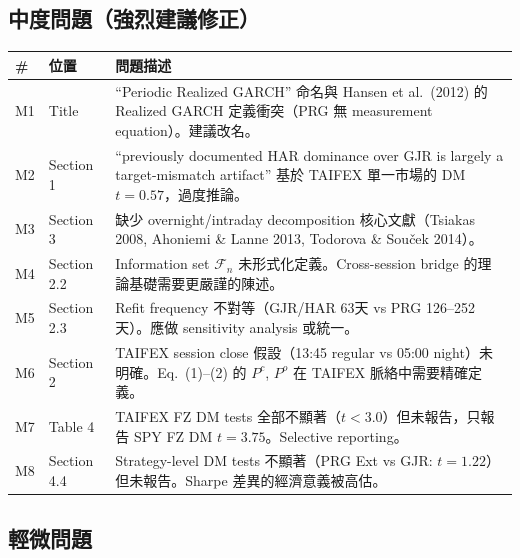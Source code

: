 \documentclass[12pt,a4paper]{article}
\begin{document}
\subsection*{中度問題（強烈建議修正）}

\begin{longtable}{p{0.5cm}p{2cm}p{11cm}}
\toprule
\# & 位置 & 問題描述 \\
\midrule
\endhead
M1 & Title & ``Periodic Realized GARCH'' 命名與 Hansen et al.\ (2012) 的 Realized GARCH 定義衝突（PRG 無 measurement equation）。建議改名。 \\
M2 & Section 1 & ``previously documented HAR dominance over GJR is largely a target-mismatch artifact'' 基於 TAIFEX 單一市場的 DM $t=0.57$，過度推論。 \\
M3 & Section 3 & 缺少 overnight/intraday decomposition 核心文獻（Tsiakas 2008, Ahoniemi \& Lanne 2013, Todorova \& Souček 2014）。 \\
M4 & Section 2.2 & Information set $\mathcal{F}_n$ 未形式化定義。Cross-session bridge 的理論基礎需要更嚴謹的陳述。 \\
M5 & Section 2.3 & Refit frequency 不對等（GJR/HAR 63天 vs PRG 126--252天）。應做 sensitivity analysis 或統一。 \\
M6 & Section 2 & TAIFEX session close 假設（13:45 regular vs 05:00 night）未明確。Eq.~(1)--(2) 的 $P^c$, $P^o$ 在 TAIFEX 脈絡中需要精確定義。 \\
M7 & Table 4 & TAIFEX FZ DM tests 全部不顯著（$t < 3.0$）但未報告，只報告 SPY FZ DM $t=3.75$。Selective reporting。 \\
M8 & Section 4.4 & Strategy-level DM tests 不顯著（PRG Ext vs GJR: $t=1.22$）但未報告。Sharpe 差異的經濟意義被高估。 \\
\bottomrule
\end{longtable}

\subsection*{輕微問題}
\end{document}
